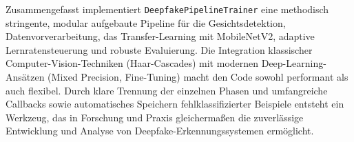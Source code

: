Zusammengefasst implementiert \texttt{DeepfakePipelineTrainer} eine methodisch stringente, modular aufgebaute Pipeline für die Gesichtsdetektion, Datenvorverarbeitung, das Transfer-Learning mit MobileNetV2, adaptive Lernratensteuerung und robuste Evaluierung. Die Integration klassischer Computer-Vision-Techniken (Haar-Cascades) mit modernen Deep-Learning-Ansätzen (Mixed Precision, Fine-Tuning) macht den Code sowohl performant als auch flexibel. Durch klare Trennung der einzelnen Phasen und umfangreiche Callbacks sowie automatisches Speichern fehlklassifizierter Beispiele entsteht ein Werkzeug, das in Forschung und Praxis gleichermaßen die zuverlässige Entwicklung und Analyse von Deepfake-Erkennungssystemen ermöglicht.
